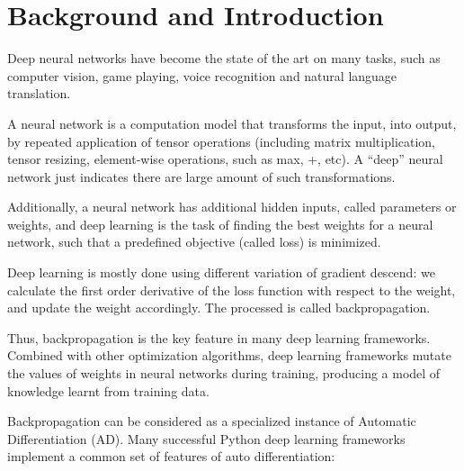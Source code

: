 
\section{Background and Introduction}

Deep neural networks have become the state of the art on many tasks, such as computer vision, game playing, voice recognition and natural language translation.

A neural network is a computation model that transforms the input, into output, by repeated application of tensor operations (including matrix multiplication, tensor resizing, element-wise operations, such as max, +, etc). A ``deep'' neural network just indicates there are large amount of such transformations.

Additionally, a neural network has additional hidden inputs, called parameters or weights, and deep learning is the task of finding the best weights for a neural network, such that a predefined objective (called loss) is minimized.

Deep learning is mostly done using different variation of gradient descend: we calculate the first order derivative of the loss function with respect to the weight, and update the weight accordingly. The processed is called backpropagation.

Thus, backpropagation\cite{rumelhart1985learning} is the key feature in many deep learning frameworks. Combined with other optimization algorithms\cite{kingma2014adam, zeiler2012adadelta,duchi2011adaptive}, deep learning frameworks mutate the values of weights in neural networks during training, producing a model of knowledge learnt from training data.

Backpropagation can be considered as a specialized instance of Automatic Differentiation (AD)\cite{baydin2015automatic}. Many successful Python deep learning frameworks\cite{tokui2015chainer,google2017eager,paszke2017pytorch,neubig2017dynet} implement a common set of features of auto differentiation:

